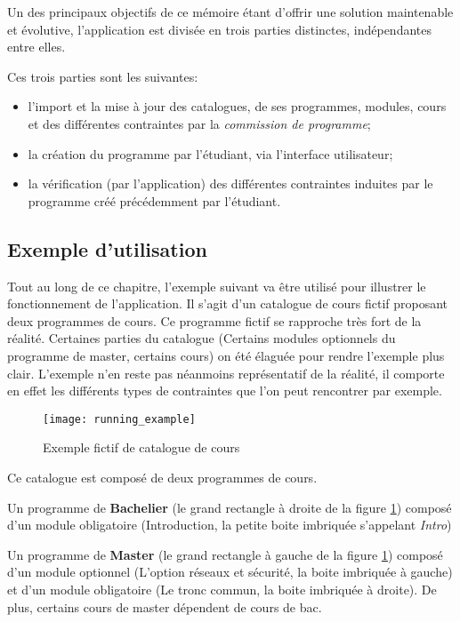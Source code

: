 Un des principaux objectifs de ce mémoire étant d'offrir une solution maintenable et évolutive, l'application est divisée en trois parties distinctes, indépendantes entre elles. 

Ces trois parties sont les suivantes:
\begin{itemize}
\item l'import et la mise à jour des catalogues, de ses programmes, modules, cours et des différentes contraintes par la \textit{commission de programme}; 
\item la création du programme par l'étudiant, via l'interface utilisateur;
\item la vérification (par l'application) des différentes contraintes induites par le programme créé précédemment par l'étudiant.
\end{itemize}

\subsection{Exemple d'utilisation}

Tout au long de ce chapitre, l'exemple suivant va être utilisé pour illustrer le fonctionnement de l'application. Il s'agit d'un catalogue de cours fictif proposant deux programmes de cours. Ce programme fictif se rapproche très fort de la réalité. Certaines parties du catalogue (Certains modules optionnels du programme de master, certains cours) on été élaguée pour rendre l'exemple plus clair. L'exemple n'en reste pas néanmoins représentatif de la réalité, il comporte en effet les différents types de contraintes que l'on peut rencontrer par exemple. 
\begin{figure}
\centering
\caption{Exemple fictif de catalogue de cours}
\label{fig:running_example}
\texttt{[image: running\_example]}
\end{figure}

Ce catalogue est composé de deux programmes de cours.

Un programme de \textbf{Bachelier} (le grand rectangle à droite de la figure \ref{fig:running_example}) composé d'un module obligatoire (Introduction, la petite boite imbriquée s’appelant \textit{Intro})

Un programme de \textbf{Master} (le grand rectangle à gauche de la figure \ref{fig:running_example}) composé d'un module optionnel (L'option réseaux et sécurité, la boite imbriquée à gauche) et d'un module obligatoire (Le tronc commun, la boite imbriquée à droite). De plus, certains cours de master dépendent de cours de bac. 



